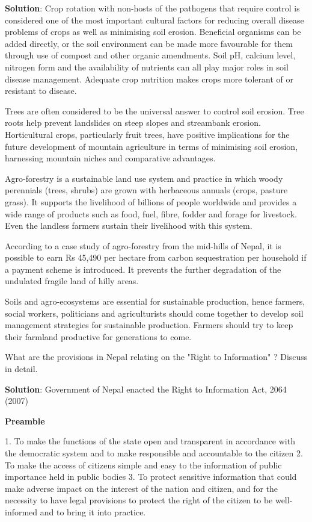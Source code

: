 \documentclass[
  openany]{book}
\newcommand{\question}{\item}
\newenvironment{solution}{ {\bfseries Solution}:}{}
\begin{document}
\begin{questions}
\begin{solution}
Crop rotation with non-hosts of the pathogens that require control is considered one of the most important cultural factors for reducing overall disease problems of crops as well as minimising soil erosion. Beneficial organisms can be added directly, or the soil environment can be made more favourable for them through use of compost and other organic amendments. Soil pH, calcium level, nitrogen form and the availability of nutrients can all play major roles in soil disease management. Adequate crop nutrition makes crops more tolerant of or resistant to disease.

Trees are often considered to be the universal answer to control soil erosion. Tree roots help prevent landslides on steep slopes and streambank erosion. Horticultural crops, particularly fruit trees, have positive implications for the future development of mountain agriculture in terms of minimising soil erosion, harnessing mountain niches and comparative advantages.

Agro-forestry is a sustainable land use system and practice in which woody perennials (trees, shrubs) are grown with herbaceous annuals (crops, pasture grass). It supports the livelihood of billions of people worldwide and provides a wide range of products such as food, fuel, fibre, fodder and forage for livestock. Even the landless farmers sustain their livelihood with this system.

According to a case study of agro-forestry from the mid-hills of Nepal, it is possible to earn Rs 45,490 per hectare from carbon sequestration per household if a payment scheme is introduced. It prevents the further degradation of the undulated fragile land of hilly areas.

Soils and agro-ecosystems are essential for sustainable production, hence farmers, social workers, politicians and agriculturists should come together to develop soil management strategies for sustainable production. Farmers should try to keep their farmland productive for generations to come.
\end{solution}

\question What are the provisions in Nepal relating on the "Right to Information" ? Discuss in detail.

\begin{solution}
Government of Nepal enacted the Right to Information Act, 2064 (2007)

\textbf{Preamble}

1. To make the functions of the state open and transparent in accordance with the democratic system and to make responsible and accountable to the citizen
2. To make the access of citizens simple and easy to the information of public importance held in public bodies
3. To protect sensitive information that could make adverse impact on the interest of the nation and citizen, and for the necessity to have legal provisions to protect the right of the citizen to be well-informed and to bring it into practice.


\end{solution}
\end{questions}
\end{document}
